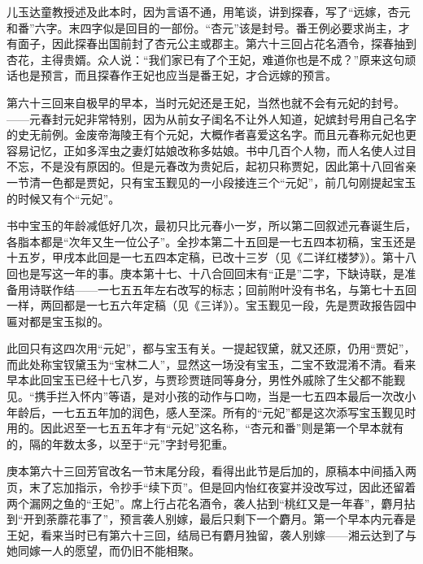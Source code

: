 \par 儿玉达童教授述及此本时，因为言语不通，用笔谈，讲到探春，写了“远嫁，杏元和番”六字。末四字似是回目的一部份。“杏元”该是封号。番王例必要求尚主，才有面子，因此探春出国前封了杏元公主或郡主。第六十三回占花名酒令，探春抽到杏花，主得贵婿。众人说：“我们家已有了个王妃，难道你也是不成？”原来这句顽话也是预言，而且探春作王妃也应当是番王妃，才合远嫁的预言。
\par 第六十三回来自极早的早本，当时元妃还是王妃，当然也就不会有元妃的封号。——元春封元妃非常特别，因为从前女子闺名不让外人知道，妃嫔封号用自己名字的史无前例。金废帝海陵王有个元妃，大概作者喜爱这名字。而且元春称元妃也更容易记忆，正如多浑虫之妻灯姑娘改称多姑娘。书中几百个人物，而人名使人过目不忘，不是没有原因的。但是元春改为贵妃后，起初只称贾妃，因此第十八回省亲一节清一色都是贾妃，只有宝玉觐见的一小段接连三个“元妃”，前几句刚提起宝玉的时候又有个“元妃”。
\par 书中宝玉的年龄减低好几次，最初只比元春小一岁，所以第二回叙述元春诞生后，各脂本都是“次年又生一位公子”。全抄本第二十五回是一七五四本初稿，宝玉还是十五岁，甲戌本此回是一七五四本定稿，已改十三岁（见《二详红楼梦》）。第十八回也是写这一年的事。庚本第十七、十八合回回末有“正是”二字，下缺诗联，是准备用诗联作结——一七五五年左右改写的标志；回前附叶没有书名，与第七十五回一样，两回都是一七五六年定稿（见《三详》）。宝玉觐见一段，先是贾政报告园中匾对都是宝玉拟的。
\par 此回只有这四次用“元妃”，都与宝玉有关。一提起钗黛，就又还原，仍用“贾妃”，而此处称宝钗黛玉为“宝林二人”，显然这一场没有宝玉，二宝不致混淆不清。看来早本此回宝玉已经十七八岁，与贾珍贾琏同等身分，男性外戚除了生父都不能觐见。“携手拦入怀内”等语，是对小孩的动作与口吻，当是一七五四本最后一次改小年龄后，一七五五年加的润色，感人至深。所有的“元妃”都是这次添写宝玉觐见时用的。因此迟至一七五五年才有“元妃”这名称，“杏元和番”则是第一个早本就有的，隔的年数太多，以至于“元”字封号犯重。
\par 庚本第六十三回芳官改名一节末尾分段，看得出此节是后加的，原稿本中间插入两页，末了忘加指示，令抄手“续下页”。但是回内怡红夜宴并没改写过，因此还留着两个漏网之鱼的“王妃”。席上行占花名酒令，袭人拈到“桃红又是一年春”，麝月拈到“开到荼蘼花事了”，预言袭人别嫁，最后只剩下一个麝月。第一个早本内元春是王妃，看来当时已有第六十三回，结局已有麝月独留，袭人别嫁——湘云达到了与她同嫁一人的愿望，而仍旧不能相聚。
